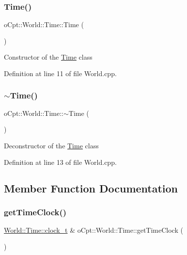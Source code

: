 \subsubsection{\texorpdfstring{Time()}{Time()}}
{\footnotesize\ttfamily o\+Cpt\+::\+World\+::\+Time\+::\+Time (\begin{DoxyParamCaption}{ }\end{DoxyParamCaption})}

Constructor of the \hyperlink{classo_cpt_1_1_world_1_1_time}{Time} class 

Definition at line 11 of file World.\+cpp.

\hypertarget{classo_cpt_1_1_world_1_1_time_a18956e4ec6a4fb4cc3a2067c9163d75d}{}\label{classo_cpt_1_1_world_1_1_time_a18956e4ec6a4fb4cc3a2067c9163d75d} 
\subsubsection{\texorpdfstring{$\sim$\+Time()}{~Time()}}
{\footnotesize\ttfamily o\+Cpt\+::\+World\+::\+Time\+::$\sim$\+Time (\begin{DoxyParamCaption}{ }\end{DoxyParamCaption})\hspace{0.3cm}{\ttfamily [virtual]}}

Deconstructor of the \hyperlink{classo_cpt_1_1_world_1_1_time}{Time} class 

Definition at line 13 of file World.\+cpp.



\subsection{Member Function Documentation}
\hypertarget{classo_cpt_1_1_world_1_1_time_a6fddffab679f3577de92c5ddf6f15f47}{}\label{classo_cpt_1_1_world_1_1_time_a6fddffab679f3577de92c5ddf6f15f47} 
\subsubsection{\texorpdfstring{get\+Time\+Clock()}{getTimeClock()}}
{\footnotesize\ttfamily \hyperlink{classo_cpt_1_1_world_1_1_time_ac41de01610f32d0ace4844ed3bf454f7}{World\+::\+Time\+::clock\+\_\+t} \& o\+Cpt\+::\+World\+::\+Time\+::get\+Time\+Clock (\begin{DoxyParamCaption}{ }\end{DoxyParamCaption})}

